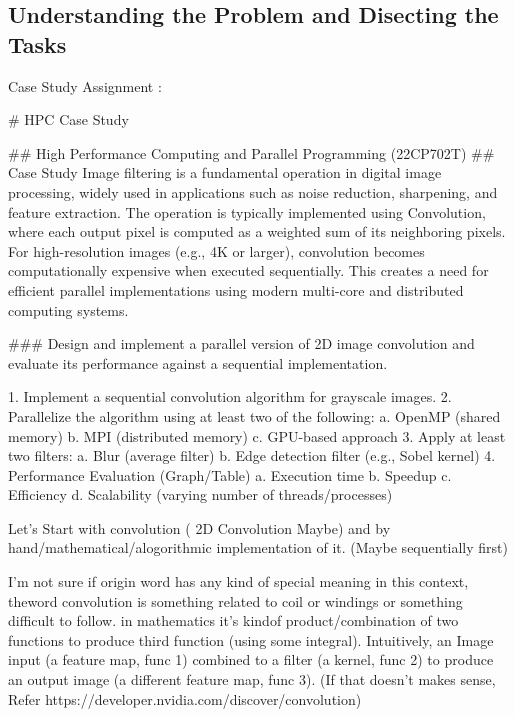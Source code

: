 \documentclass[
]{article}
\newenvironment{Shaded}{}{}
\newcommand{\FunctionTok}[1]{\textcolor[rgb]{0.02,0.16,0.49}{#1}}
\newcommand{\NormalTok}[1]{#1}
\newcommand{\SpecialStringTok}[1]{\textcolor[rgb]{0.73,0.40,0.53}{#1}}
\begin{document}
\subsection{Understanding the Problem and Disecting the
Tasks}\label{understanding-the-problem-and-disecting-the-tasks}

Case Study Assignment :

\begin{Shaded}
\begin{Highlighting}[]
\FunctionTok{\# HPC Case Study}

\FunctionTok{\#\# High Performance Computing and Parallel Programming (22CP702T)}
\FunctionTok{\#\# Case Study}
\NormalTok{Image filtering is a fundamental operation in digital image processing, widely used in applications such as noise reduction, sharpening, and feature extraction. The operation is typically implemented using Convolution, where each output pixel is computed as a weighted sum of its neighboring pixels. For high{-}resolution images (e.g., 4K or larger), convolution becomes computationally expensive when executed sequentially. This creates a need for efficient parallel implementations using modern multi{-}core and distributed computing systems. }

\FunctionTok{\#\#\# Design and implement a parallel version of 2D image convolution and evaluate its performance against a sequential implementation.}

\SpecialStringTok{1. }\NormalTok{Implement a sequential convolution algorithm for grayscale images.}
\SpecialStringTok{2. }\NormalTok{Parallelize the algorithm using at least two of the following:}
\NormalTok{    a. OpenMP (shared memory)}
\NormalTok{    b. MPI (distributed memory)}
\NormalTok{    c. GPU{-}based approach}
\SpecialStringTok{3. }\NormalTok{Apply at least two filters:}
\NormalTok{    a. Blur (average filter)}
\NormalTok{    b. Edge detection filter (e.g., Sobel kernel)}
\SpecialStringTok{4. }\NormalTok{Performance Evaluation (Graph/Table)}
\NormalTok{    a. Execution time}
\NormalTok{    b. Speedup}
\NormalTok{    c. Efficiency}
\NormalTok{    d. Scalability (varying number of threads/processes)}
\end{Highlighting}
\end{Shaded}

Let's Start with convolution ( 2D Convolution Maybe) and by
hand/mathematical/alogorithmic implementation of it. (Maybe sequentially
first)

I'm not sure if origin word has any kind of special meaning in this
context, theword convolution is something related to coil or windings or
something difficult to follow. in mathematics it's kindof
product/combination of two functions to produce third function (using
some integral). Intuitively, an Image input (a feature map, func 1)
combined to a filter (a kernel, func 2) to produce an output image (a
different feature map, func 3). (If that doesn't makes sense, Refer
https://developer.nvidia.com/discover/convolution)
\end{document}
